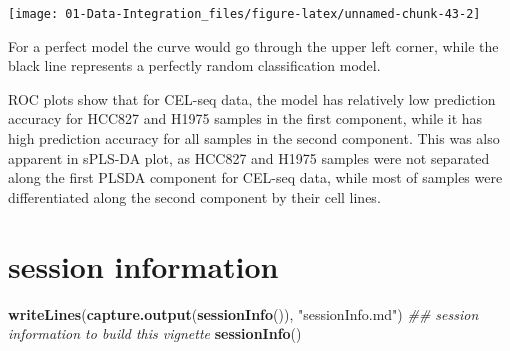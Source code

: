 \documentclass[]{book}
\newenvironment{Shaded}{\begin{snugshade}}{\end{snugshade}}
\newcommand{\CommentTok}[1]{\textcolor[rgb]{0.56,0.35,0.01}{\textit{#1}}}
\newcommand{\KeywordTok}[1]{\textcolor[rgb]{0.13,0.29,0.53}{\textbf{#1}}}
\newcommand{\NormalTok}[1]{#1}
\newcommand{\StringTok}[1]{\textcolor[rgb]{0.31,0.60,0.02}{#1}}
\theoremstyle{definition}
\theoremstyle{definition}
\theoremstyle{definition}
\theoremstyle{remark}
\begin{document}
\begin{center}\texttt{[image: 01-Data-Integration\_files/figure-latex/unnamed-chunk-43-2]} \end{center}

For a perfect model the curve would go through the upper left corner,
while the black line represents a perfectly random classification model.

ROC plots show that for CEL-seq data, the model has relatively low
prediction accuracy for HCC827 and H1975 samples in the first component,
while it has high prediction accuracy for all samples in the second
component. This was also apparent in sPLS-DA plot, as HCC827 and H1975
samples were not separated along the first PLSDA component for CEL-seq
data, while most of samples were differentiated along the second
component by their cell lines.

\hypertarget{session-information}{%
\section{session information}\label{session-information}}

\begin{Shaded}
\begin{Highlighting}[]
\KeywordTok{writeLines}\NormalTok{(}\KeywordTok{capture.output}\NormalTok{(}\KeywordTok{sessionInfo}\NormalTok{()), }\StringTok{"sessionInfo.md"}\NormalTok{)}
\CommentTok{## session information to build this vignette}
\KeywordTok{sessionInfo}\NormalTok{()}
\end{Highlighting}
\end{Shaded}
\end{document}
